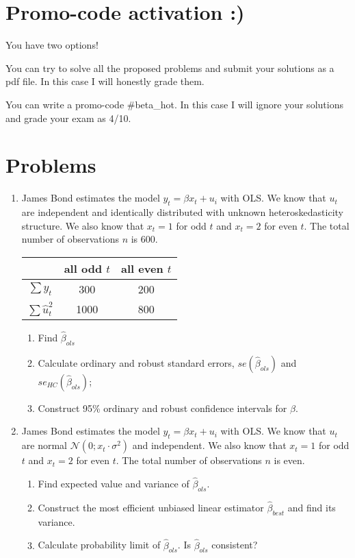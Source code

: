 \documentclass[12pt]{article}
\def \cN{\mathcal{N}}
\begin{document}
\section*{Promo-code activation :)}

You have two options! 

You can try to solve all the proposed problems and submit your solutions as a pdf file.
In this case I will honestly grade them.

You can write a promo-code \#beta\_hot. 
In this case I will ignore your solutions and grade your exam as 4/10. 

\section*{Problems}

\begin{enumerate}

	\item James Bond estimates the model $y_t = \beta x_t + u_i$ with OLS.
	We know that $u_t$ are independent and identically distributed with unknown heteroskedasticity structure.
	We also know that $x_t = 1$ for odd $t$ and $x_t = 2$ for even $t$.
	The total number of observations $n$ is 600. 
  
	\begin{tabular}{ccc}
	  \toprule
		 & all odd $t$ & all even $t$ \\
	  \midrule
	  $\sum y_t$ & 300 & 200  \\
	  $\sum \hat u_t^2$ & 1000 & 800 \\
	  \bottomrule
  \end{tabular}
  
  
   \begin{enumerate}
	  \item Find $\hat\beta_{ols}$
	   \item Calculate ordinary and robust standard errors, $se(\hat\beta_{ols})$ and $se_{HC}(\hat\beta_{ols})$;
	   \item Construct 95\% ordinary and robust confidence intervals for $\beta$. 
   \end{enumerate}
  


	\item James Bond estimates the model $y_t = \beta x_t + u_i$ with OLS.
	We know that $u_t$ are normal $\cN(0; x_t \cdot \sigma^2)$ and independent.
	We also know that $x_t = 1$ for odd $t$ and $x_t = 2$ for even $t$.
	The total number of observations $n$ is even. 
	    \begin{enumerate}
      \item Find expected value and variance of $\hat \beta_{ols}$.
      \item Construct the most efficient unbiased linear estimator $\hat\beta_{best}$ and find its variance.
 	  \item Calculate probability limit of $\hat \beta_{ols}$. Is $\hat \beta_{ols}$ consistent?
    \end{enumerate}


\end{enumerate}
\end{document}
